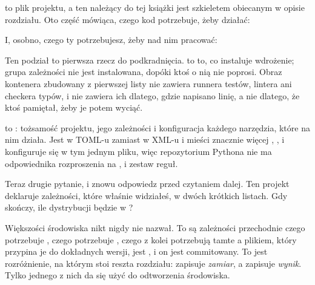 \noindent
{} to plik projektu, a ten należący do tej książki jest
szkieletem obiecanym w opisie rozdziału. Oto część mówiąca, czego kod
potrzebuje, żeby działać:


\noindent
I, osobno, czego ty potrzebujesz, żeby nad nim pracować:


\noindent
Ten podział to pierwsza rzecz do podkradnięcia. 
to to, co instaluje wdrożenie; grupa zależności nie jest instalowana, dopóki
ktoś o nią nie poprosi. Obraz kontenera zbudowany z pierwszej listy nie
zawiera runnera testów, lintera ani checkera typów, i nie zawiera ich dlatego,
gdzie napisano linię, a nie dlatego, że ktoś pamiętał, żeby je potem wyciąć.

\begin{csbox}
 to : tożsamość projektu, jego zależności i
konfiguracja każdego narzędzia, które na nim działa. Jest w TOML-u zamiast w
XML-u i mieści znacznie więcej \dash{} , , 
i  konfiguruje się w tym jednym pliku, więc repozytorium Pythona nie
ma odpowiednika rozproszenia na ,
 i zestaw reguł.
\end{csbox}

\noindent
Teraz drugie pytanie, i znowu odpowiedz przed czytaniem dalej. Ten projekt
deklaruje zależności, które właśnie widziałeś, w dwóch krótkich listach. Gdy
 skończy, ile dystrybucji będzie w ?



\noindent
Większości środowiska nikt nigdy nie nazwał. To są zależności przechodnie
\dash{} czego potrzebuje , czego potrzebuje ,
czego z kolei potrzebują tamte \dash{} a plikiem, który przypina je do
dokładnych wersji, jest , i on jest commitowany. To jest
rozróżnienie, na którym stoi reszta rozdziału:  zapisuje
\emph{zamiar}, a  zapisuje \emph{wynik}. Tylko jednego z nich da
się użyć do odtworzenia środowiska.

